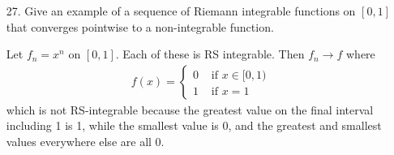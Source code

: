 \documentclass{article}
\begin{document}
\begin{itemize}
	\item[27.] Give an example of a sequence of Riemann integrable functions on $[0, 1]$ that converges pointwise to a non-integrable function.
		\begin{soln}
			Let $f_n=x^n$ on $[0, 1].$ Each of these is RS integrable. Then $f_n\to f$ where
			\begin{align*}
				f(x) = \begin{cases}
					0 & \text{ if } x\in[0, 1) \\
						1 & \text{ if } x= 1
				\end{cases}
			\end{align*}
			which is not RS-integrable because the greatest value on the final interval including 1 is 1, while the smallest value is 0, and the greatest and smallest values everywhere else are all 0.
		\end{soln}
		
\end{itemize}
\end{document}
